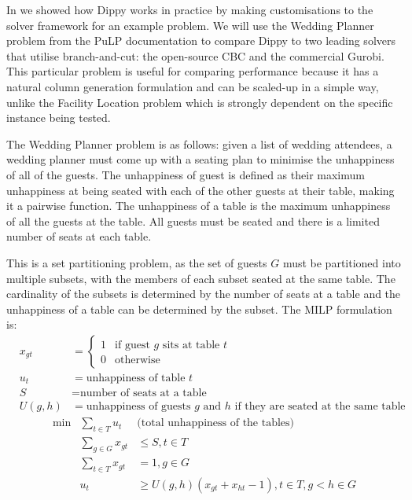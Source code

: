 In  we showed how Dippy works in practice by making customisations to the solver framework for an example problem.
We will use the Wedding Planner problem from the PuLP documentation \cite{pulp} to compare Dippy to two leading solvers that utilise branch-and-cut: the open-source CBC and the commercial Gurobi.
This particular problem is useful for comparing performance because it has a natural column generation formulation and can be scaled-up in a simple way, unlike the Facility Location problem which is strongly dependent on the specific instance being tested.

The Wedding Planner problem is as follows: given a list of wedding attendees, a wedding planner must come up with a seating plan to minimise the unhappiness of all of the guests.
The unhappiness of guest is defined as their maximum unhappiness at being seated with each of the other guests at their table, making it a pairwise function.
The unhappiness of a table is the maximum unhappiness of all the guests at the table.
All guests must be seated and there is a limited number of seats at each table.

This is a set partitioning problem, as the set of guests $G$ must be partitioned into multiple subsets, with the members of each subset seated at the same table.
The cardinality of the subsets is determined by the number of seats at a table and the unhappiness of a table can be determined by the subset.
The \ac{MILP} formulation is:
\[
\begin{array}{rrl}
& x_{gt} &= \begin{cases} 1 & \text{if guest $g$ sits at table $t$} \\
 0 & \text{otherwise} \end{cases} \\
& u_t &= \text{unhappiness of table $t$} \\
& S &= \text{number of seats at a table} \\
& U(g, h) &= \text{unhappiness of guests $g$ and $h$ if they are seated at the same table}
\end{array}
\]\[
\begin{array}{rrl}
\min & \displaystyle \sum_{t \in T} u_t & \text{(total unhappiness of the tables)} \\
& \displaystyle \sum_{g \in G} x_{gt} &\leq S, t \in T \\
& \displaystyle \sum_{t \in T} x_{gt} &=1, g \in G \\
& u_t &\geq U(g, h) (x_{gt} + x_{ht} - 1), t \in T, g < h \in G
\end{array}
\]


